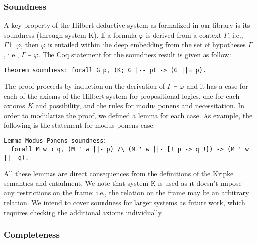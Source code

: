 \documentclass[3p,times]{elsarticle}
\begin{document}
\subsubsection{Soundness}\label{sec:soundness}

A key property of the Hilbert deductive system as formalized
in our library is its soundness (through system K). If a formula $\varphi$ is derived from a
context $\Gamma$, i.e., $\Gamma\vdash\varphi$, then $\varphi$ is entailed within the deep embedding
from the set of hypotheses $\Gamma$, i.e., $\Gamma\models\varphi$. The Coq statement for the soundness
result is given as follow:

\begin{verbatim}
Theorem soundness: forall G p, (K; G |-- p) -> (G ||= p).
\end{verbatim}

The proof proceeds by induction on the derivation of $\Gamma \vdash\varphi$ and
it has a case for each of the axioms of the Hilbert system for propositional
logics, one for each axioms $K$ and possibility, and the rules for modus
ponens and necessitation. In order to modularize the proof, we defined a lemma for each case.
As example, the following is the statement for modus ponens case.
\begin{verbatim}
Lemma Modus_Ponens_soundness:
  forall M w p q, (M ' w ||- p) /\ (M ' w ||- [! p -> q !]) -> (M ' w ||- q).
\end{verbatim}
All these lemmas are direct consequences from the definitions of the Kripke
semantics and entailment. We note that system K is used as it doesn't impose
any restrictions on the frame:
i.e., the relation on the frame may be an arbitrary relation.
We intend to cover soundness for larger systems as future work, which requires
checking the additional axioms individually.

\subsubsection{Completeness}\label{sec:completeness}
\end{document}
